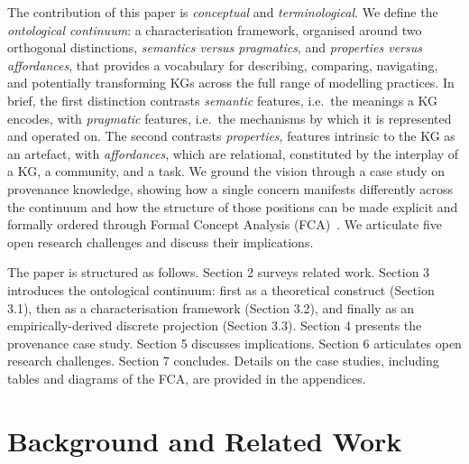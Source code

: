 \documentclass[runningheads]{llncs}
\newenvironment{onlyextended}{\ignorespaces}{\ignorespacesafterend}
\newenvironment{onlyshort}{\ignorespaces}{\ignorespacesafterend}
\newenvironment{inboth}{}{}
\newcommand{\ppinfo}[1]{{ \normalfont\color{red}\small(#1 pp)}}
\renewcommand{\ppinfo}[1]{} %
\begin{document}
\begin{inboth}
The contribution of this paper is \emph{conceptual} and \emph{terminological}. 
We define the \textit{ontological continuum}: a characterisation framework, organised around two orthogonal distinctions, \emph{semantics versus pragmatics}, and \emph{properties versus affordances}, that provides a vocabulary for describing, comparing, navigating, and potentially transforming KGs across the full range of modelling practices. 
In brief, the first distinction contrasts \emph{semantic} features, i.e.\ the meanings a KG encodes, with \emph{pragmatic} features, i.e.\ the mechanisms by which it is represented and operated on.
The second contrasts \emph{properties}, features intrinsic to the KG as an artefact, with \emph{affordances}, which are relational, constituted by the interplay of a KG, a community, and a task.
%
We ground the vision through a case study on provenance knowledge, 
showing how a single concern manifests differently across the continuum 
and how the structure of those positions can be made explicit and formally 
ordered through Formal Concept Analysis (FCA)~\cite{ganter1999formal,poelmans2013formal}. 
We articulate five open research challenges and discuss their implications.
\end{inboth}

\begin{onlyextended}
The paper is structured as follows. 
Section 2 surveys related work. Section 3 introduces the ontological continuum: first as a theoretical construct (Section 3.1), then as a characterisation framework (Section 3.2), and finally as an empirically-derived discrete projection (Section 3.3). Section 4 presents the provenance case study. 
Section 5 discusses implications. Section 6 articulates open research challenges. 
Section 7 concludes.
Details on the case studies, including tables and diagrams of the FCA, are provided in the appendices.
\end{onlyextended}

\section{Background and Related Work\ppinfo{starts at p3, 1.5}}\begin{onlyshort}\vspace{-0.2cm}
\end{onlyshort}
\label{sec:background}
\end{document}
